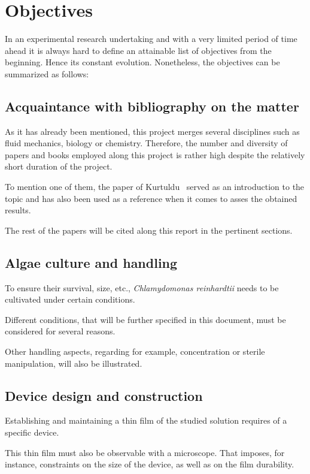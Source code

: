 \chapter{Objectives}
\label{objectives}

In an experimental research undertaking and with a very limited period of time ahead it is always hard to define an attainable list of objectives from the beginning. Hence its constant evolution. Nonetheless, the objectives can be summarized as follows:

\section{Acquaintance with bibliography on the matter}

As it has already been mentioned, this project merges several disciplines such as fluid mechanics, biology or chemistry. Therefore, the number and diversity of papers and books employed along this project is rather high despite the relatively short duration of the project.

To mention one of them, the paper of Kurtuldu~\cite{Kurtuldu2011} served as an introduction to the topic and has also been used as a reference when it comes to asses the obtained results.

The rest of the papers will be cited along this report in the pertinent sections.

\section{Algae culture and handling}

To ensure their survival, size, etc., \textit{Chlamydomonas reinhardtii} needs to be cultivated under certain conditions.

Different conditions, that will be further specified in this document, must be considered for several reasons.

Other handling aspects, regarding for example, concentration or sterile manipulation, will also be illustrated. 

\section{Device design and construction}

Establishing and maintaining a thin film of the studied solution requires of a specific device. 

This thin film must also be observable with a microscope. That imposes, for instance, constraints on the size of the device, as well as on the film durability.

